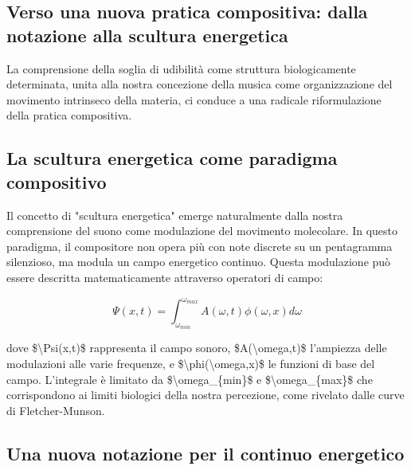 \documentclass[a4paper,11pt]{article}
\begin{document}
\subsection{Verso una nuova pratica compositiva: dalla notazione alla scultura energetica}\hypertarget{verso-una-nuova-pratica-compositiva-dalla-notazione-alla-scultura-energetica}{}\label{verso-una-nuova-pratica-compositiva-dalla-notazione-alla-scultura-energetica}

La comprensione della soglia di udibilità come struttura biologicamente
determinata, unita alla nostra concezione della musica come
organizzazione del movimento intrinseco della materia, ci conduce a una
radicale riformulazione della pratica compositiva.

\subsection{La scultura energetica come paradigma compositivo}\hypertarget{la-scultura-energetica-come-paradigma-compositivo}{}\label{la-scultura-energetica-come-paradigma-compositivo}

Il concetto di "scultura energetica" emerge naturalmente dalla nostra
comprensione del suono come modulazione del movimento molecolare. In
questo paradigma, il compositore non opera più con note discrete su un
pentagramma silenzioso, ma modula un campo energetico continuo. Questa
modulazione può essere descritta matematicamente attraverso operatori di
campo:

\begin{displaymath}
\Psi(x,t) = \int_{\omega_{min}}^{\omega_{max}} A(\omega,t)\phi(\omega,x)d\omega
\end{displaymath}

dove \$\textbackslash{}Psi(x,t)\$ rappresenta il campo sonoro, \$A(\textbackslash{}omega,t)\$ l'ampiezza
delle modulazioni alle varie frequenze, e \$\textbackslash{}phi(\textbackslash{}omega,x)\$ le funzioni
di base del campo. L'integrale è limitato da \$\textbackslash{}omega\_\{min\}\$ e
\$\textbackslash{}omega\_\{max\}\$ che corrispondono ai limiti biologici della nostra
percezione, come rivelato dalle curve di Fletcher-Munson.

\subsection{Una nuova notazione per il continuo energetico}\hypertarget{una-nuova-notazione-per-il-continuo-energetico}{}\label{una-nuova-notazione-per-il-continuo-energetico}
\end{document}

